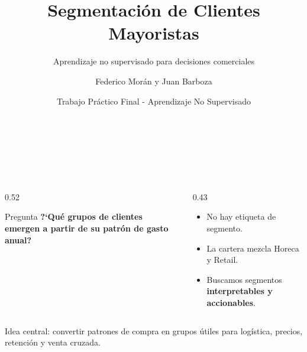 \documentclass[aspectratio=169,10pt]{beamer}
\title{Segmentaci\'on de Clientes Mayoristas}
\subtitle{Aprendizaje no supervisado para decisiones comerciales}
\author{Federico Mor\'an y Juan Barboza}
\date{Trabajo Pr\'actico Final - Aprendizaje No Supervisado}
\newcommand{\highlight}[1]{\textcolor{DeepTeal}{\textbf{#1}}}
\newcommand{\smallnote}[1]{{\scriptsize\textcolor{Muted}{#1}}}
\begin{document}
\begin{frame}[plain]
  \vspace{0.25cm}
  {\Large\bfseries\color{Ink}\inserttitle}\\[0.1cm]
  {\color{DeepTeal}\insertsubtitle}\\[0.35cm]
  {\small \insertauthor}\\[0.1cm]
  {\scriptsize\color{Muted}\insertdate}

  \vfill
  \begin{columns}[T,onlytextwidth]
    \begin{column}{0.52\textwidth}
      \begin{block}{Pregunta}
        \large
        \textbf{?`Qu\'e grupos de clientes emergen a partir de su patr\'on de gasto anual?}
      \end{block}
    \end{column}
    \begin{column}{0.43\textwidth}
      \begin{itemize}
        \item No hay etiqueta de segmento.
        \item La cartera mezcla Horeca y Retail.
        \item Buscamos segmentos \highlight{interpretables y accionables}.
      \end{itemize}
    \end{column}
  \end{columns}

  \vfill
  \smallnote{Idea central: convertir patrones de compra en grupos \'utiles para log\'istica, precios, retenci\'on y venta cruzada.}
\end{frame}
\end{document}

